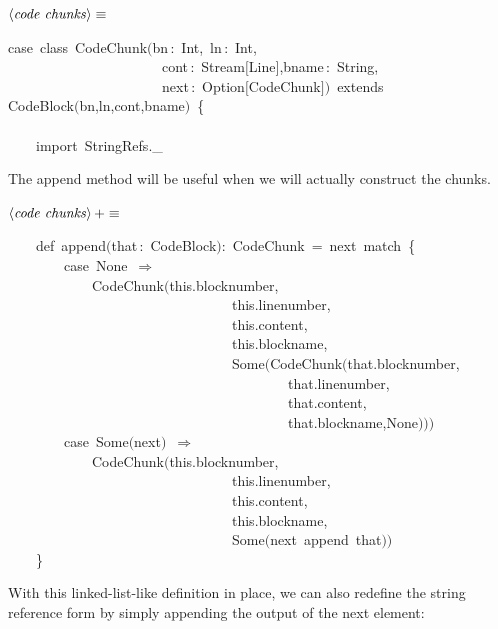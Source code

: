 \documentclass[a4paper,12pt]{article}
\begin{document}
$\left<\mbox{\emph{code chunks}}\right>\equiv$
\begin{program}{\vem case}~{\vem class}~CodeChunk$($bn\,{\rm :}~Int,~ln\,{\rm :}~Int,
\\~~~~~~~~~~~~~~~~~~~~~~cont\,{\rm :}~Stream$[$Line$]$,bname\,{\rm :}~String,
\\~~~~~~~~~~~~~~~~~~~~~~next\,{\rm :}~Option$[$CodeChunk$]$$)$~{\vem extends}
\\CodeBlock$($bn,ln,cont,bname$)$~{\small\{}
\\~~~~
\\~~~~{\vem import}~StringRefs.\_
\\[0.5em]\end{program}
The append method will be useful when we will actually construct
the chunks.

$\left<\mbox{\emph{code chunks}}\right>+\equiv$
\begin{program}~~~~{\vem def}~append$($that\,{\rm :}~CodeBlock$)${\rm :}~CodeChunk~=~next~{\vem match}~{\small\{}
\\~~~~~~~~{\vem case}~None~$\Rightarrow$
\\~~~~~~~~~~~~CodeChunk$(${\vem this}.blocknumber,
\\~~~~~~~~~~~~~~~~~~~~~~~~~~~~~~~~{\vem this}.linenumber,
\\~~~~~~~~~~~~~~~~~~~~~~~~~~~~~~~~{\vem this}.content,
\\~~~~~~~~~~~~~~~~~~~~~~~~~~~~~~~~{\vem this}.blockname,
\\~~~~~~~~~~~~~~~~~~~~~~~~~~~~~~~~Some$($CodeChunk$($that.blocknumber,
\\~~~~~~~~~~~~~~~~~~~~~~~~~~~~~~~~~~~~~~~~that.linenumber,
\\~~~~~~~~~~~~~~~~~~~~~~~~~~~~~~~~~~~~~~~~that.content,
\\~~~~~~~~~~~~~~~~~~~~~~~~~~~~~~~~~~~~~~~~that.blockname,None$)$$)$$)$
\\~~~~~~~~{\vem case}~Some$($next$)$~$\Rightarrow$
\\~~~~~~~~~~~~CodeChunk$(${\vem this}.blocknumber,
\\~~~~~~~~~~~~~~~~~~~~~~~~~~~~~~~~{\vem this}.linenumber,
\\~~~~~~~~~~~~~~~~~~~~~~~~~~~~~~~~{\vem this}.content,
\\~~~~~~~~~~~~~~~~~~~~~~~~~~~~~~~~{\vem this}.blockname,
\\~~~~~~~~~~~~~~~~~~~~~~~~~~~~~~~~Some$($next~append~that$)$$)$
\\~~~~{\small\}}
\\[0.5em]\end{program}
With this linked-list-like definition in place, we can also redefine
the string reference form by simply appending the output of the next
element:
\end{document}
